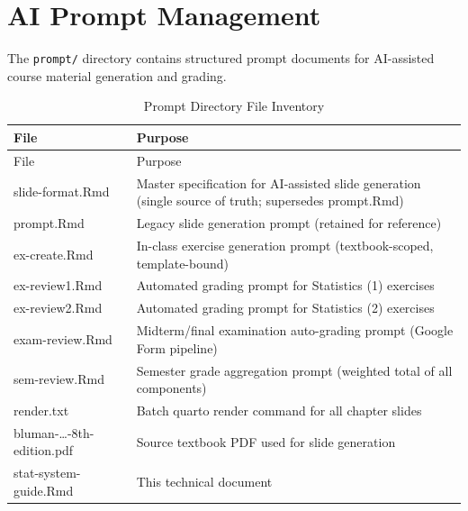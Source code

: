 \documentclass[
]{article}
\begin{document}
\newpage

\section{AI Prompt Management}\label{ai-prompt-management}

The \texttt{prompt/} directory contains structured prompt documents for
AI-assisted course material generation and grading.

\begin{longtable}[]{@{}
  >{\raggedright\arraybackslash}p{}
  >{\raggedright\arraybackslash}p{}@{}}
\caption{Prompt Directory File Inventory}\tabularnewline
\toprule\noalign{}
\begin{minipage}[b]{\linewidth}\raggedright
File
\end{minipage} & \begin{minipage}[b]{\linewidth}\raggedright
Purpose
\end{minipage} \\
\midrule\noalign{}
\endfirsthead
\toprule\noalign{}
\begin{minipage}[b]{\linewidth}\raggedright
File
\end{minipage} & \begin{minipage}[b]{\linewidth}\raggedright
Purpose
\end{minipage} \\
\midrule\noalign{}
\endhead
\bottomrule\noalign{}
\endlastfoot
slide-format.Rmd & Master specification for AI-assisted slide generation
(single source of truth; supersedes prompt.Rmd) \\
prompt.Rmd & Legacy slide generation prompt (retained for reference) \\
ex-create.Rmd & In-class exercise generation prompt (textbook-scoped,
template-bound) \\
ex-review1.Rmd & Automated grading prompt for Statistics (1)
exercises \\
ex-review2.Rmd & Automated grading prompt for Statistics (2)
exercises \\
exam-review.Rmd & Midterm/final examination auto-grading prompt (Google
Form pipeline) \\
sem-review.Rmd & Semester grade aggregation prompt (weighted total of
all components) \\
render.txt & Batch quarto render command for all chapter slides \\
bluman-\ldots-8th-edition.pdf & Source textbook PDF used for slide
generation \\
stat-system-guide.Rmd & This technical document \\
\end{longtable}
\end{document}
